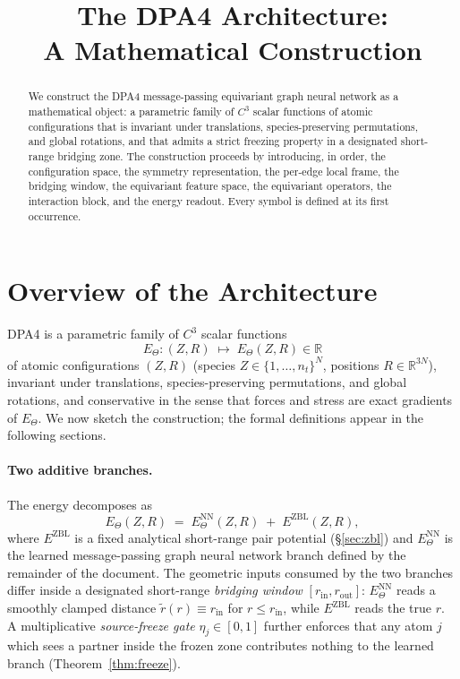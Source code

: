 \documentclass[11pt,a4paper]{article}
\title{The DPA4 Architecture:\\ A Mathematical Construction}
\author{}
\date{}
\newcommand{\R}{\mathbb{R}}
\newcommand{\rin}{r_{\mathrm{in}}}
\newcommand{\rout}{r_{\mathrm{out}}}
\newcommand{\rtilde}{\widetilde{r}}
\theoremstyle{plain}
\theoremstyle{definition}
\theoremstyle{remark}
\begin{document}
\maketitle

\begin{abstract}
    We construct the DPA4 message-passing equivariant graph neural network as a mathematical object: a parametric family of $C^3$ scalar functions of atomic configurations that is invariant under translations, species-preserving permutations, and global rotations, and that admits a strict freezing property in a designated short-range bridging zone.
    The construction proceeds by introducing, in order, the configuration space, the symmetry representation, the per-edge local frame, the bridging window, the equivariant feature space, the equivariant operators, the interaction block, and the energy readout.
    Every symbol is defined at its first occurrence.
\end{abstract}

\tableofcontents

\section{Overview of the Architecture}\label{sec:overview}

DPA4 is a parametric family of $C^3$ scalar functions
\begin{equation}\label{eq:overall}
    E_\Theta : (Z,R)\;\longmapsto\;E_\Theta(Z,R)\in\R
\end{equation}
of atomic configurations $(Z,R)$ (species $Z\in\{1,\dots,n_t\}^N$, positions $R\in\R^{3N}$), invariant under translations, species-preserving permutations, and global rotations, and conservative in the sense that forces and stress are exact gradients of $E_\Theta$.
We now sketch the construction; the formal definitions appear in the following sections.

\paragraph{Two additive branches.}
The energy decomposes as
\begin{equation}\label{eq:overview-decomp}
    E_\Theta(Z,R) \;=\; E^{\mathrm{NN}}_\Theta(Z,R) \;+\; E^{\mathrm{ZBL}}(Z,R),
\end{equation}
where $E^{\mathrm{ZBL}}$ is a fixed analytical short-range pair potential (\S\ref{sec:zbl}) and $E^{\mathrm{NN}}_\Theta$ is the learned message-passing graph neural network branch defined by the remainder of the document.
The geometric inputs consumed by the two branches differ inside a designated short-range \emph{bridging window} $[\rin,\rout]$: $E^{\mathrm{NN}}_\Theta$ reads a smoothly clamped distance $\rtilde(r)\equiv\rin$ for $r\leq\rin$, while $E^{\mathrm{ZBL}}$ reads the true $r$.
A multiplicative \emph{source-freeze gate} $\eta_j\in[0,1]$ further enforces that any atom $j$ which sees a partner inside the frozen zone contributes nothing to the learned branch (Theorem~\ref{thm:freeze}).
\end{document}
